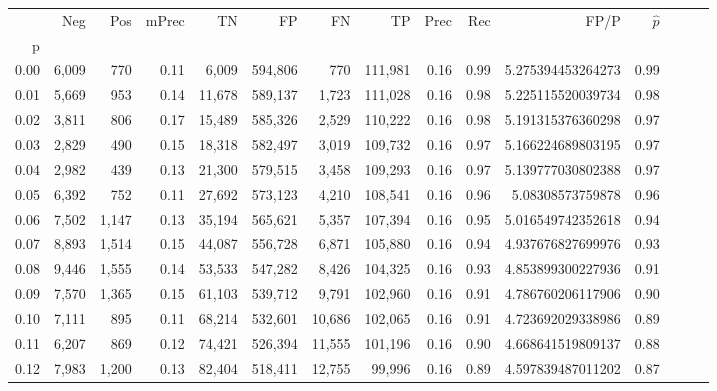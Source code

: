 \begin{tabular}{rrrrrrrrrrrrrrr}
\toprule
{} &     Neg &    Pos & mPrec &       TN &       FP &       FN &       TP &  Prec &   Rec &                  FP/P & $\hat{p}$ \\
p    &         &        &       &          &          &          &          &       &       &                       &           \\
\midrule
0.00 &   6,009 &    770 &  0.11 &    6,009 &  594,806 &      770 &  111,981 &  0.16 &  0.99 &     5.275394453264273 &      0.99 \\
0.01 &   5,669 &    953 &  0.14 &   11,678 &  589,137 &    1,723 &  111,028 &  0.16 &  0.98 &     5.225115520039734 &      0.98 \\
0.02 &   3,811 &    806 &  0.17 &   15,489 &  585,326 &    2,529 &  110,222 &  0.16 &  0.98 &     5.191315376360298 &      0.97 \\
0.03 &   2,829 &    490 &  0.15 &   18,318 &  582,497 &    3,019 &  109,732 &  0.16 &  0.97 &     5.166224689803195 &      0.97 \\
0.04 &   2,982 &    439 &  0.13 &   21,300 &  579,515 &    3,458 &  109,293 &  0.16 &  0.97 &     5.139777030802388 &      0.97 \\
0.05 &   6,392 &    752 &  0.11 &   27,692 &  573,123 &    4,210 &  108,541 &  0.16 &  0.96 &      5.08308573759878 &      0.96 \\
0.06 &   7,502 &  1,147 &  0.13 &   35,194 &  565,621 &    5,357 &  107,394 &  0.16 &  0.95 &     5.016549742352618 &      0.94 \\
0.07 &   8,893 &  1,514 &  0.15 &   44,087 &  556,728 &    6,871 &  105,880 &  0.16 &  0.94 &     4.937676827699976 &      0.93 \\
0.08 &   9,446 &  1,555 &  0.14 &   53,533 &  547,282 &    8,426 &  104,325 &  0.16 &  0.93 &     4.853899300227936 &      0.91 \\
0.09 &   7,570 &  1,365 &  0.15 &   61,103 &  539,712 &    9,791 &  102,960 &  0.16 &  0.91 &     4.786760206117906 &      0.90 \\
0.10 &   7,111 &    895 &  0.11 &   68,214 &  532,601 &   10,686 &  102,065 &  0.16 &  0.91 &     4.723692029338986 &      0.89 \\
0.11 &   6,207 &    869 &  0.12 &   74,421 &  526,394 &   11,555 &  101,196 &  0.16 &  0.90 &     4.668641519809137 &      0.88 \\
0.12 &   7,983 &  1,200 &  0.13 &   82,404 &  518,411 &   12,755 &   99,996 &  0.16 &  0.89 &     4.597839487011202 &      0.87 \\

\end{tabular}

